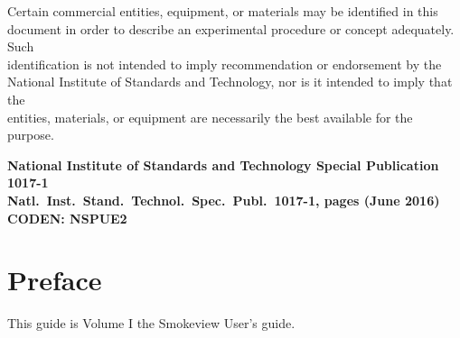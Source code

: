 \documentclass[11pt,twoside]{book}
\begin{document}
\date{}

\setlength{\parindent}{0.25in}

\newpage

\begin{minipage}[t][9in][s]{6.5in}


\begin{flushright}
Certain commercial entities, equipment, or materials may be identified in this \\
document in order to describe an experimental procedure or concept adequately. Such \\
identification is not intended to imply recommendation or endorsement by the \\
National Institute of Standards and Technology, nor is it intended to imply that the \\
entities, materials, or equipment are necessarily the best available for the purpose.
\end{flushright}

\vspace{3in}


\vspace{3in}

\large
\begin{flushright}
\bf National Institute of Standards and Technology Special Publication 1017-1 \\
Natl.~Inst.~Stand.~Technol.~Spec.~Publ.~1017-1, \pageref{LastPage} pages (June 2016) \\
CODEN: NSPUE2
\end{flushright}

\vfill

\end{minipage}


\frontmatter

\pagestyle{plain}


\chapter{Preface}
\smvoverview
This guide is Volume I the  Smokeview User's guide.
\end{document}
